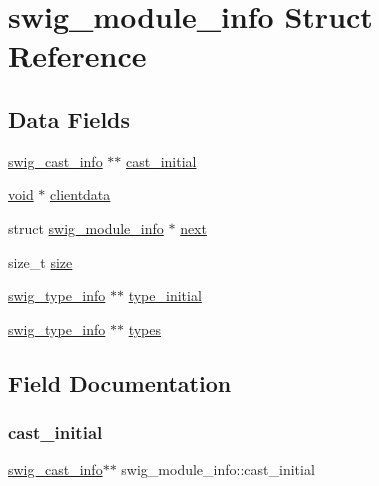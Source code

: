 \hypertarget{structswig__module__info}{}\section{swig\+\_\+module\+\_\+info Struct Reference}
\label{structswig__module__info}
\subsection*{Data Fields}
\begin{DoxyCompactItemize}
\item 
\hyperlink{structswig__cast__info}{swig\+\_\+cast\+\_\+info} $\ast$$\ast$ \hyperlink{structswig__module__info_a15f6b50a41f144afb1148fc412dc01f7}{cast\+\_\+initial}
\item 
\hyperlink{lp__lib_8h_ac7828c7b2b31d2e11af17bdb6289c5d9}{void} $\ast$ \hyperlink{structswig__module__info_a9fb6e461fcaf14c209049adfae4e9754}{clientdata}
\item 
struct \hyperlink{structswig__module__info}{swig\+\_\+module\+\_\+info} $\ast$ \hyperlink{structswig__module__info_ac177d150b85ab77122089acf1f06d9c6}{next}
\item 
size\+\_\+t \hyperlink{structswig__module__info_aaf8907cf8509ee0464af8c9dfd909042}{size}
\item 
\hyperlink{structswig__type__info}{swig\+\_\+type\+\_\+info} $\ast$$\ast$ \hyperlink{structswig__module__info_a76c7d5b0fc10371748616d0b6c815a17}{type\+\_\+initial}
\item 
\hyperlink{structswig__type__info}{swig\+\_\+type\+\_\+info} $\ast$$\ast$ \hyperlink{structswig__module__info_ad658c7738e9a035ef8eea865322fbf13}{types}
\end{DoxyCompactItemize}


\subsection{Field Documentation}
\mbox{\label{structswig__module__info_a15f6b50a41f144afb1148fc412dc01f7}} 
\subsubsection{\texorpdfstring{cast\+\_\+initial}{cast\_initial}}
{\footnotesize\ttfamily \hyperlink{structswig__cast__info}{swig\+\_\+cast\+\_\+info}$\ast$$\ast$ swig\+\_\+module\+\_\+info\+::cast\+\_\+initial}


